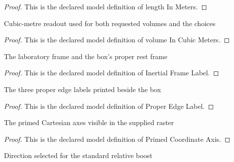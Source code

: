 \begin{proof}
  This is the declared model definition of length In Meters.
\end{proof}
\begin{definition}
  \label{def:physics:phyx-mini-0559:phyxminiproblems-problemphyxmini0559-volumeincubicmeters}
  Cubic-metre readout used for both requested volumes and the choices
\end{definition}
\begin{proof}
  This is the declared model definition of volume In Cubic Meters.
\end{proof}
\begin{definition}
  \label{def:physics:phyx-mini-0559:phyxminiproblems-problemphyxmini0559-inertialframelabel}
  The laboratory frame and the box's proper rest frame
\end{definition}
\begin{proof}
  This is the declared model definition of Inertial Frame Label.
\end{proof}
\begin{definition}
  \label{def:physics:phyx-mini-0559:phyxminiproblems-problemphyxmini0559-properedgelabel}
  The three proper edge labels printed beside the box
\end{definition}
\begin{proof}
  This is the declared model definition of Proper Edge Label.
\end{proof}
\begin{definition}
  \label{def:physics:phyx-mini-0559:phyxminiproblems-problemphyxmini0559-primedcoordinateaxis}
  The primed Cartesian axes visible in the supplied raster
\end{definition}
\begin{proof}
  This is the declared model definition of Primed Coordinate Axis.
\end{proof}
\begin{definition}
  \label{def:physics:phyx-mini-0559:phyxminiproblems-problemphyxmini0559-boostdirection}
  Direction selected for the standard relative boost
\end{definition}
